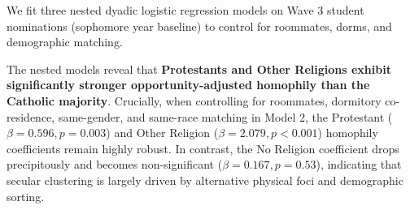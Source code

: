 \documentclass[
  letterpaper,
  DIV=11,
  numbers=noendperiod]{scrartcl}
\begin{document}
We fit three nested dyadic logistic regression models on Wave 3 student
nominations (sophomore year baseline) to control for roommates, dorms,
and demographic matching.

\begin{table}

\caption{\label{tbl-wave3-reg}Nested Dyadic Logistic Regressions
Predicting Same-Religion Ties (Wave 3).}


\end{table}%

The nested models reveal that \textbf{Protestants and Other Religions
exhibit significantly stronger opportunity-adjusted homophily than the
Catholic majority}. Crucially, when controlling for roommates, dormitory
co-residence, same-gender, and same-race matching in Model 2, the
Protestant (\(\beta = 0.596, p = 0.003\)) and Other Religion
(\(\beta = 2.079, p < 0.001\)) homophily coefficients remain highly
robust. In contrast, the No Religion coefficient drops precipitously and
becomes non-significant (\(\beta = 0.167, p = 0.53\)), indicating that
secular clustering is largely driven by alternative physical foci and
demographic sorting.
\end{document}
